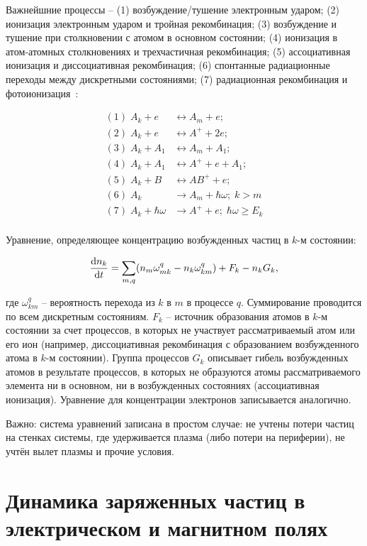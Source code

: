 \documentclass[10pt, a4paper]{article}
\let\stdsection\section
\renewcommand\section{\newpage\stdsection}
\begin{document}
Важнейшние процессы -- (1) возбуждение/тушение электронным ударом; (2) ионизация электронным ударом	и тройная рекомбинация; (3) возбуждение и тушение при столкновении с атомом в основном состоянии; (4) ионизация в атом-атомных столкновениях и трехчастичная рекомбинация; (5) ассоциативная ионизация и диссоциативная рекомбинация; (6) спонтанные радиационные переходы между дискретными состояниями; (7) радиационная рекомбинация и фотоионизация~\cite{biberman}:

\begin{align*}
	(1)\;A_k + e &\leftrightarrow A_m + e;\\
	(2)\;A_k + e &\leftrightarrow A^{+} + 2e;\\
	(3)\;A_k + A_1 &\leftrightarrow A_m + A_1;\\
	(4)\;A_k + A_1 &\leftrightarrow A^{+} + e + A_1;\\
	(5)\;A_k + B &\leftrightarrow AB^{+} + e;\\
	(6)\;A_k &\rightarrow A_m + \hbar\omega;\;k>m\\
	(7)\;A_k + \hbar\omega &\rightarrow A^{+} + e;\;\hbar\omega\geq E_k\\
\end{align*}

Уравнение, определяющее концентрацию возбужденных частиц в $k$-м состоянии:

\begin{equation*}
	\dv{n_k}{t} = \sum\limits_{m, q}(n_m\omega_{mk}^q-n_k\omega_{km}^q)+F_k-n_kG_k,
\end{equation*}

где $\omega_{km}^q$ -- вероятность перехода из $k$ в $m$ в процессе $q$. Суммирование проводится по всем дискретным состояниям. $F_k$ -- источник образования атомов в $k$-м состоянии за счет процессов, в которых не участвует рассматриваемый атом или его ион (например, диссоциативная рекомбинация с образованием возбужденного атома в $k$-м состоянии). Группа процессов $G_k$ описывает гибель возбужденных атомов в результате процессов, в которых не образуются атомы рассматриваемого элемента ни в основном, ни в возбужденных состояниях (ассоциативная ионизация). Уравнение для концентрации электронов записывается аналогично.

Важно: система уравнений записана в простом случае: не учтены потери частиц на стенках системы, где удерживается плазма (либо потери на периферии), не учтён вылет плазмы и прочие условия.

\section{Динамика заряженных частиц в электрическом и магнитном полях}
\end{document}
